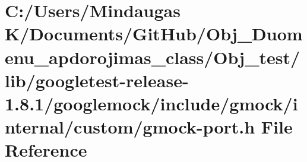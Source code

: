 \hypertarget{_obj__test_2lib_2googletest-release-1_88_81_2googlemock_2include_2gmock_2internal_2custom_2gmock-port_8h}{}\section{C\+:/\+Users/\+Mindaugas K/\+Documents/\+Git\+Hub/\+Obj\+\_\+\+Duomenu\+\_\+apdorojimas\+\_\+class/\+Obj\+\_\+test/lib/googletest-\/release-\/1.8.1/googlemock/include/gmock/internal/custom/gmock-\/port.h File Reference}
\label{_obj__test_2lib_2googletest-release-1_88_81_2googlemock_2include_2gmock_2internal_2custom_2gmock-port_8h}
